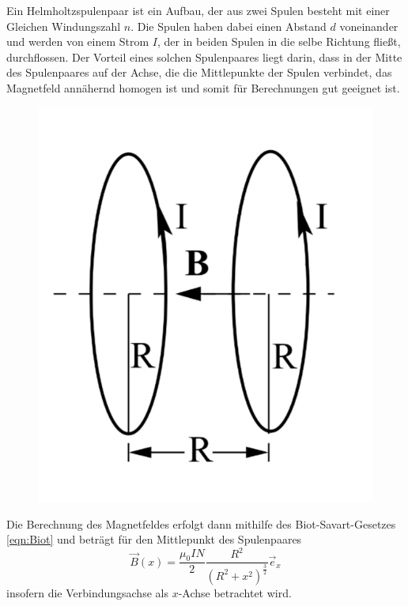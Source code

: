 \noindent Ein Helmholtzspulenpaar ist ein Aufbau, der aus zwei Spulen besteht mit einer Gleichen Windungszahl $n$. Die Spulen
haben dabei einen Abstand $d$ voneinander und werden von einem Strom $I$, der in beiden Spulen in die selbe Richtung fließt, 
durchflossen. Der Vorteil eines solchen Spulenpaares liegt darin,
dass  in der Mitte des Spulenpaares auf der Achse, die die Mittlepunkte der Spulen verbindet, das Magnetfeld annähernd homogen 
ist und somit für Berechnungen gut geeignet ist.
\begin{figure}[H]
    \centering
    \includegraphics{Bilder/Helmholtz.png}
    \label{fig:helm}
\end{figure}
\noindent Die Berechnung des Magnetfeldes erfolgt dann mithilfe des Biot-Savart-Gesetzes \ref{eqn:Biot} und beträgt für den 
Mittlepunkt des Spulenpaares
\begin{equation}
    \vec{B}(x)=\frac{\mu_0IN}{2}\frac{R^2}{(R^2+x^2)^\frac{3}{2}}\vec{e}_x
    \label{eqn:magfeld}
\end{equation}
insofern die Verbindungsachse als $x$-Achse betrachtet wird. \\

